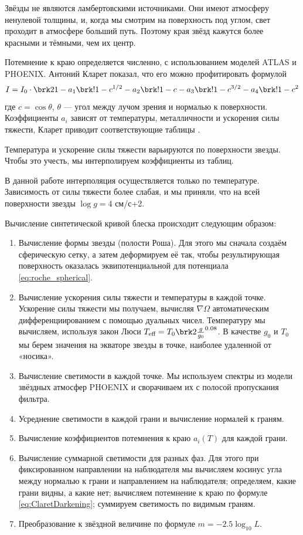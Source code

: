 
Звёзды не являются ламбертовскими источниками. Они имеют атмосферу ненулевой толщины, и, когда мы смотрим на поверхность под углом, свет проходит в атмосфере больший путь. Поэтому края звёзд кажутся более красными и тёмными, чем их центр.

Потемнение к краю определяется численно, с использованием моделей ATLAS и PHOENIX. Антоний Кларет показал, что его можно профитировать формулой
\begin{equation}
I = I_0 \cdot \brk2{
    1 - a_1 \brk!{1 - c^{1/2}} - a_2 \brk!{1 - c} - a_3 \brk!{1 - c^{3/2}} - a_4 \brk!{1 - c^2}
}
\label{eq:ClaretDarkening}
\end{equation}
где $c = \cos \theta$, $\theta$ --- угол между лучом зрения и нормалью к поверхности. Коэффициенты $a_i$ зависят от температуры, металличности и ускорения силы тяжести, Кларет приводит соответствующие таблицы \cite{ClaretDarkening}.

Температура и ускорение силы тяжести варьируются по поверхности звезды. Чтобы это учесть, мы интерполируем коэффициенты из таблиц.

В данной работе интерполяция осуществляется только по температуре. Зависимость от силы тяжести более слабая, и мы приняли, что на всей поверхности звезды $\log g = 4$ см/с+2.



Вычисление синтетической кривой блеска происходит следующим образом:
\begin{enumerate}
    \item Вычисление формы звезды (полости Роша). Для этого мы сначала создаём сферическую сетку, а затем деформируем её так, чтобы результирующая поверхность оказалась эквипотенциальной для потенциала \eqref{eq:roche_spherical}.
    \item Вычисление ускорения силы тяжести и температуры в каждой точке. Ускорение силы тяжести мы получаем, вычисляя $\nabla \Omega$ автоматическим дифференциированием с помощью дуальных чисел. Температуру мы вычисляем, используя закон Люси $T_\text{eff} = T_0 \brk2{\frac{g}{g_0}}^{0.08}$. В качестве $g_0$ и $T_0$ мы берем значения на экваторе звезды в точке, наиболее удаленной от «носика».
    \item Вычисление светимости в каждой точке. Мы используем спектры из модели звёздных атмосфер PHOENIX и сворачиваем их с полосой пропускания фильтра.
    \item Усреднение светимости в каждой грани и вычисление нормалей к граням.
    \item Вычисление коэффициентов потемнения к краю $a_i(T)$ для каждой грани.
    \item Вычисление суммарной светимости для разных фаз. Для этого при фиксированном направлении на наблюдателя мы вычисляем косинус угла между нормалью к грани и направлением на наблюдателя; определяем, какие грани видны, а какие нет; вычисляем потемнение к краю по формуле \eqref{eq:ClaretDarkening}; суммируем светимость по видимым граням.
    \item Преобразование к звёздной величине по формуле $m = -2.5 \log_{10} L$.
\end{enumerate}

